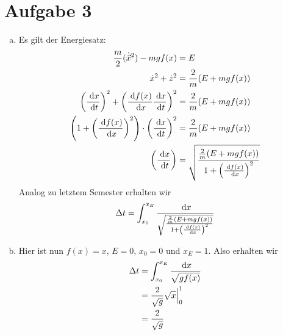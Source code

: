 \documentclass{article}
\theoremstyle{definition}
\begin{document}
\section*{Aufgabe 3}
\begin{enumerate}[(a)]
    \item 
    Es gilt der Energiesatz:
    \begin{align*}
        \frac{m}{2}(\dot{\vec{x}}^2) - mgf(x) &= E\\
        \dot x ^2 + \dot z^2 &= \frac{2}{m} (E + mgf(x))\\
        \left(\frac{\d x}{\d t}\right)^2 + \left(\frac{\d f(x)}{\d x}\frac{\d x}{\d t}\right)^2 &= \frac{2}{m} (E + mgf(x))\\
        \left(1 + \left(\frac{\d f(x)}{\d x}\right)^2\right) \cdot \left(\frac{\d x}{\d t}\right)^2 &= \frac{2}{m} (E + mgf(x))\\
        \left(\frac{\d x}{\d t}\right) &= \sqrt{\frac{\frac{2}{m} (E + mgf(x))}{1 + \left(\frac{\d f(x)}{\d x}\right)^2}}\\
    \end{align*}
    Analog zu letztem Semester erhalten wir
    $$\Delta t = \int_{x_0}^{x_E} \frac{\d x}{\sqrt{\frac{\frac{2}{m} (E + mgf(x))}{1 + \left(\frac{\d f(x)}{\d x}\right)^2}}}$$
    \item Hier ist nun $f(x) = x$, $E = 0$, $x_0 = 0$ und $x_E = 1$. Also erhalten wir
    \begin{align*}
        \Delta t &= \int_{x_0}^{x_E} \frac{\d x}{\sqrt{gf(x)}}\\
        &= \frac{2}{\sqrt{g}} \sqrt{x} \Big|^1_0\\
        &= \frac{2}{\sqrt{g}}
    \end{align*}
\end{enumerate}
\end{document}

